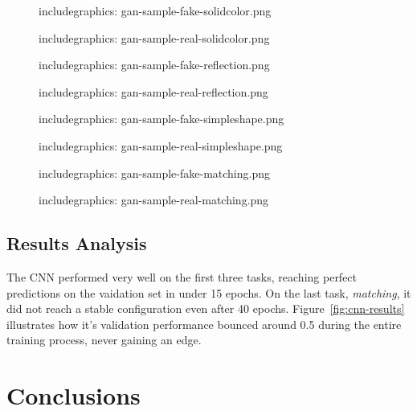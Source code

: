 \documentclass{article}
\renewcommand{\it}{\textit}
\newcommand{\tmpincludegraphics}[1][opt]{includegraphics: }
\begin{document}
\clearpage
{}
\thispagestyle{empty}
\begin{figure}[ht]
\label{fig:gan-samples-solidcolor}
\centering
\tmpincludegraphics[height=323px]{gan-sample-fake-solidcolor.png}
\caption{}
\vspace{1em}
\tmpincludegraphics[height=323px]{gan-sample-real-solidcolor.png}
\end{figure}

\clearpage
\thispagestyle{empty}
\begin{figure}[ht]
\label{fig:gan-samples-reflection}
\centering
\tmpincludegraphics[height=323px]{gan-sample-fake-reflection.png}
\caption{}
\vspace{1em}
\tmpincludegraphics[height=323px]{gan-sample-real-reflection.png}
\end{figure}

\clearpage
\thispagestyle{empty}
\begin{figure}[ht]
\label{fig:gan-samples-simpleshape}
\centering
\tmpincludegraphics[height=323px]{gan-sample-fake-simpleshape.png}
\caption{}
\vspace{1em}
\tmpincludegraphics[height=323px]{gan-sample-real-simpleshape.png}
\end{figure}

\clearpage
\thispagestyle{empty}
\begin{figure}[ht]
\label{fig:gan-samples-matching}
\centering
\tmpincludegraphics[height=323px]{gan-sample-fake-matching.png}
\caption{}
\vspace{1em}
\tmpincludegraphics[height=323px]{gan-sample-real-matching.png}
\end{figure}

\restoregeometry
\pagestyle{plain}

\newpage

\subsection{Results Analysis}

The CNN performed very well on the first three tasks, reaching perfect predictions on the vaidation set in under 15 epochs.
On the last task, \it{matching}, it did not reach a stable configuration even after 40 epochs.
Figure~\ref{fig:cnn-results} illustrates how it's validation performance bounced around 0.5 during the entire training process, never gaining an edge.


\section{Conclusions}
\end{document}
